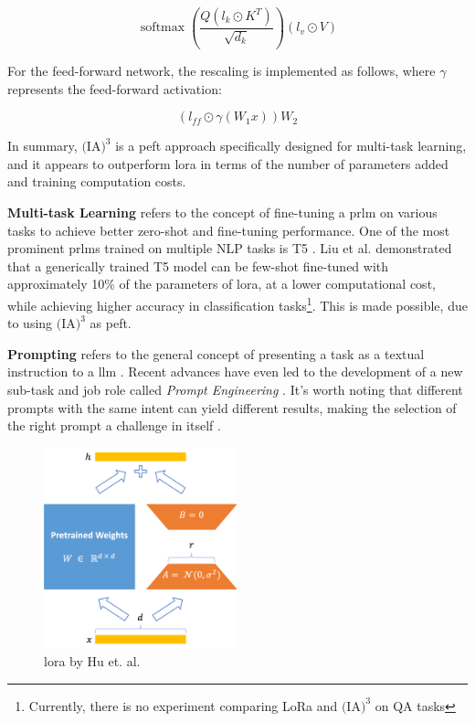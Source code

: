 \begin{equation}
    \operatorname{softmax}\left(\frac{Q\left(l_{k} \odot K^T\right)}{\sqrt{d_k}}\right)\left(l_{v} \odot V\right)
\end{equation}

For the feed-forward network, the rescaling is implemented as follows, where \(\gamma\) represents the feed-forward activation:

\begin{equation}
    (l_{ff} \odot \gamma (W_1x))W_2
\end{equation}

In summary, \textbf{$\text{(IA)}^3$} is a \gls{peft} approach specifically designed for multi-task learning, and it appears to outperform \gls{lora} in terms of the number of parameters added and training computation costs.

\textbf{Multi-task Learning} refers to the concept of fine-tuning a \gls{prlm} on various tasks to achieve better zero-shot and fine-tuning performance. One of the most prominent \gls{prlm}s trained on multiple NLP tasks is T5 \cite{raffel_exploring_2023}. Liu et al. \cite{liu_few-shot_2022} demonstrated that a generically trained T5 model can be few-shot fine-tuned with approximately 10\% of the parameters of \gls{lora}, at a lower computational cost, while achieving higher accuracy in classification tasks\footnote{Currently, there is no experiment comparing LoRa and $\text{(IA)}^3$ on QA tasks}. This is made possible, due to using $\text{(IA)}^3$ as \gls{peft}.

\textbf{Prompting} refers to the general concept of presenting a task as a textual instruction to a \gls{llm} \cite{brown_language_2020}. Recent advances have even led to the development of a new sub-task and job role called \textit{Prompt Engineering} \cite{white_prompt_2023}. It's worth noting that different prompts with the same intent can yield different results, making the selection of the right prompt a challenge in itself \cite{liu_gpt_2021}.


\begin{figure}
    \centering
    \includegraphics[width=0.5\textwidth]{Grafiken/Lora.png}
    \caption{\gls{lora} by Hu et. al. \cite{hu_lora_nodate}}
    \label{fig:lora}
\end{figure}


